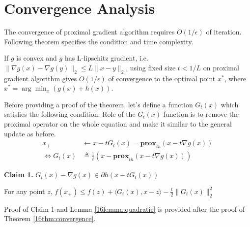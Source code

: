 \documentclass[12pt]{report}
\begin{document}
\section{Convergence Analysis} \label{PGA_CONVERGENCE}
The convergence of proximal gradient algorithm requires $O(1/\epsilon)$ of iteration. Following theorem specifies the condition and time complexity.

\begin{theorem}\label{16thm:convergence}
If $g$ is convex and $g$ has L-lipschitz gradient, i.e. $\| \nabla g(x) - \nabla g(y)\|_2 \leq L\|x-y\|_2$, using fixed size $t < 1/L$ on proximal gradient algorithm gives $O(1/\epsilon)$ of convergence to the optimal point $x^*$, where $x^* = \arg\min_x \left( g(x) + h(x)\right)$.
\end{theorem}

Before providing a proof of the theorem, let's define a function $G_t (x)$ which satisfies the following condition. Role of the $G_t(x)$ function is to remove the proximal operator on the whole equation and make it similar to the general update as before.
\begin{align*}
x_+ &\leftarrow x-t G_t (x)=\textbf{prox}_{th}(x-t\nabla g(x))\\
\Leftrightarrow G_t (x) &\triangleq \frac{1}{t}\left( x - \textbf{prox}_{th}(x-t\nabla g(x)) \right)
\end{align*}

\noindent\textbf{Claim 1.} $G_t (x)- \nabla g(x) \in \partial h(x-tG_t (x))$

\begin{lemma}
\label{16lemma:quadratic} 
For any point $z$, $f(x_+)\leq f(z)+ \langle G_t (x),x-z \rangle -\frac{t}{2}\|G_t (x)\|_2^2 $
\end{lemma}
Proof of Claim 1 and Lemma \ref{16lemma:quadratic} is provided after the proof of Theorem \ref{16thm:convergence}.
\end{document}
